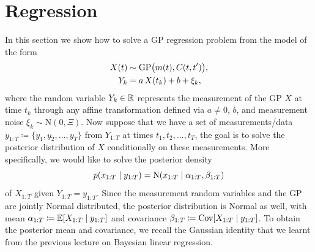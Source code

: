 \documentclass[]{article}
\begin{document}
\section{Regression}
\label{sec:regression}
In this section we show how to solve a GP regression problem from the model of the form
%
\begin{equation}
	\begin{split}
		X(t) &\sim \mathrm{GP}\bigl( m(t), C(t, t') \bigr), \\
		Y_k &= a \, X(t_k) + b + \xi_k,
		\label{equ:gp-regression-model}
	\end{split}
\end{equation}
%
where the random variable $Y_k \in \mathbb{R}$ represents the measurement of the GP $X$ at time $t_k$ through any affine transformation defined via $a\neq 0$, $b$, and measurement noise $\xi_k \sim \mathrm{N}(0, \Xi)$. Now suppose that we have a set of measurements/data $y_{1:T} \coloneqq \lbrace y_1, y_2, \ldots, y_T\rbrace$ from $Y_{1:T}$ at times $t_1, t_2,\ldots, t_T$, the goal is to solve the posterior distribution of $X$ conditionally on these measurements. More specifically, we would like to solve the posterior density
%
\begin{equation*}
	p(x_{1:T} {\;|\;} y_{1:T}) = \mathrm{N}(x_{1:T} {\;|\;} \alpha_{1:T}, \beta_{1:T})
\end{equation*}
%
of $X_{1:T}$ given $Y_{1:T} = y_{1:T}$. Since the measurement random variables and the GP are jointly Normal distributed, the posterior distribution is Normal as well, with mean $\alpha_{1:T} \coloneqq \expec{X_{1:T} \cond y_{1:T}}$ and covariance $\beta_{1:T} \coloneqq \cov{X_{1:T} \cond y_{1:T}}$. To obtain the posterior mean and covariance, we recall the Gaussian identity that we learnt from the previous lecture on Bayesian linear regression.
\end{document}
